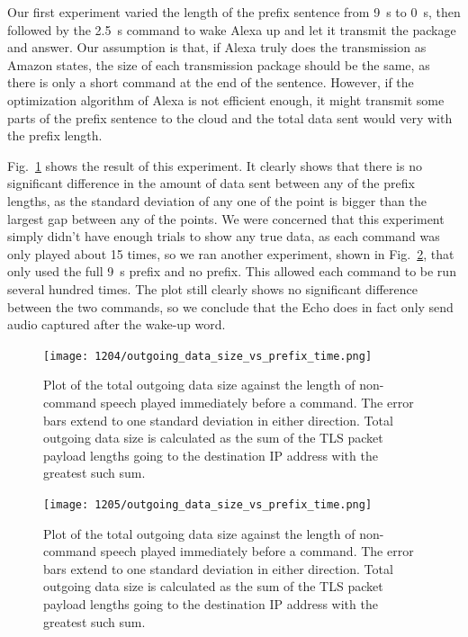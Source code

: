 Our first experiment varied the length of the prefix sentence from 9~s to 0~s, then followed by the 2.5~s command to wake Alexa up and let it transmit the package and answer. Our assumption is that, if Alexa truly does the transmission as Amazon states, the size of each transmission package should be the same, as there is only a short command at the end of the sentence. However, if the optimization algorithm of Alexa is not efficient enough, it might transmit some parts of the prefix sentence to the cloud and the total data sent would very with the prefix length. 

Fig.~\ref{fig:prefix_many} shows the result of this experiment. It clearly shows that there is no significant difference in the amount of data sent between any of the prefix lengths, as the standard deviation of any one of the point is bigger than the largest gap between any of the points. We were concerned that this experiment simply didn't have enough trials to show any true data, as each command was only played about 15 times, so we ran another experiment, shown in Fig.~\ref{fig:prefix_two}, that only used the full 9~s prefix and no prefix. This allowed each command to be run several hundred times. The plot still clearly shows no significant difference between the two commands, so we conclude that the Echo does in fact only send audio captured after the wake-up word.
 
\begin{figure}[!t]
    \centering
    \texttt{[image: 1204/outgoing\_data\_size\_vs\_prefix\_time.png]}
    \caption{Plot of the total outgoing data size against the length of non-command speech played immediately before a command. The error bars extend to one standard deviation in either direction. Total outgoing data size is calculated as the sum of the TLS packet payload lengths going to the destination IP address with the greatest such sum.}
    \label{fig:prefix_many}
\end{figure}

\begin{figure}[!t]
    \centering
    \texttt{[image: 1205/outgoing\_data\_size\_vs\_prefix\_time.png]}
    \caption{Plot of the total outgoing data size against the length of non-command speech played immediately before a command. The error bars extend to one standard deviation in either direction. Total outgoing data size is calculated as the sum of the TLS packet payload lengths going to the destination IP address with the greatest such sum.}
    \label{fig:prefix_two}
\end{figure}




